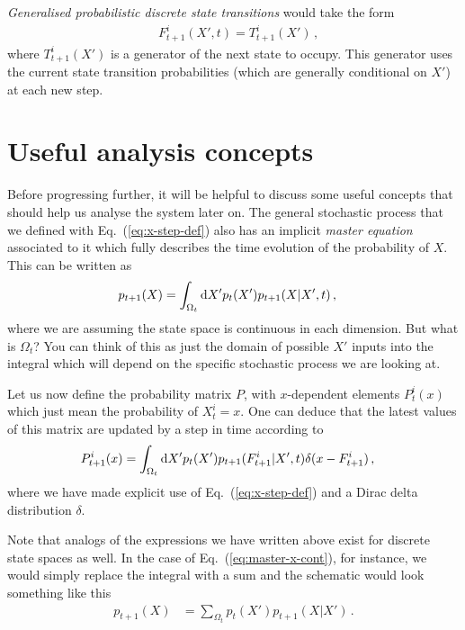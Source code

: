 \documentclass{book}
\begin{document}
\emph{Generalised probabilistic discrete state transitions} would take the form
\begin{align}
& F^{i}_{t+1}(X',t) = T^i_{t+1}(X')\,,
\end{align}
where $T^i_{t+1}(X')$ is a generator of the next state to occupy. This generator uses the current state transition probabilities (which are generally conditional on $X'$) at each new step.

\section{\sffamily Useful analysis concepts}

Before progressing further, it will be helpful to discuss some useful concepts that should help us analyse the system later on. The general stochastic process that we defined with Eq.~(\ref{eq:x-step-def}) also has an implicit \emph{master equation} associated to it which fully describes the time evolution of the probability of $X$. This can be written as
\begin{align}
p_{t+1}(X) &= \int_{\Omega_t}{\rm d}X' p_{t}(X') p_{t+1}(X\vert X',t) \label{eq:master-x-cont} \,,
\end{align}
where we are assuming the state space is continuous in each dimension. But what is $\Omega_t$? You can think of this as just the domain of possible $X'$ inputs into the integral which will depend on the specific stochastic process we are looking at.

Let us now define the probability matrix $P$, with $x$-dependent elements $P^i_{t}(x)$ which just mean the probability of $X^i_t=x$. One can deduce that the latest values of this matrix are updated by a step in time according to
\begin{align}
P^i_{t+1}(x) &= \int_{\Omega_t}{\rm d}X' p_{t}(X') p_{t+1}(F^i_{t+1}|X',t) \delta (x-F^i_{t+1}) \label{eq:master-x-cont-update}\,,
\end{align}
where we have made explicit use of Eq.~(\ref{eq:x-step-def}) and a Dirac delta distribution $\delta$.

Note that analogs of the expressions we have written above exist for discrete state spaces as well. In the case of Eq.~(\ref{eq:master-x-cont}), for instance, we would simply replace the integral with a sum and the schematic would look something like this
\begin{align}
p_{t+1}(X) &= \sum_{\Omega_t} p_t(X') p_{t+1}(X \vert X') \label{eq:master-x-disc} \,.
\end{align}
\end{document}
